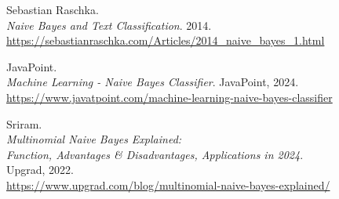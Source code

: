 \documentclass[a4paper,12pt]{report}
\begin{document}
\begin{thebibliography}{99}
Sebastian Raschka. \\
\textit{Naive Bayes and Text Classification}. 
2014. \\
\url{https://sebastianraschka.com/Articles/2014_naive_bayes_1.html}

JavaPoint. \\
\textit{Machine Learning - Naive Bayes Classifier}. 
JavaPoint, 2024. \\
\url{https://www.javatpoint.com/machine-learning-naive-bayes-classifier}

Sriram. \\
\textit{Multinomial Naive Bayes Explained: \\ 
Function, Advantages \& Disadvantages, Applications in 2024}. \\
Upgrad, 2022. \\
\url{https://www.upgrad.com/blog/multinomial-naive-bayes-explained/}

\end{thebibliography}
\end{document}
